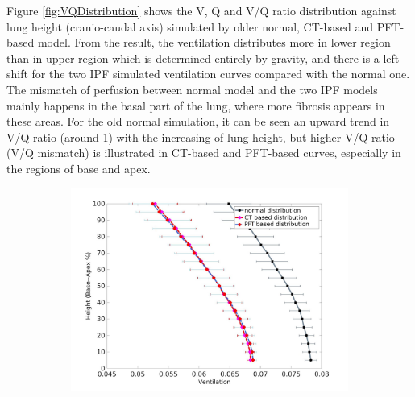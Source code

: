 Figure \ref{fig:VQDistribution} shows the V, Q and V/Q ratio distribution against lung height (cranio-caudal axis) simulated by older normal, CT-based and PFT-based model. From the result, the ventilation distributes more in lower region than in upper region which is determined entirely by gravity, and there is a left shift for the two IPF simulated ventilation curves compared with the normal one. The mismatch of perfusion between normal model and the two IPF models mainly happens in the basal part of the lung, where more fibrosis appears in these areas. For the old normal simulation, it can be seen an upward trend in V/Q ratio (around 1) with the increasing of lung height, but higher V/Q ratio (V/Q mismatch) is illustrated in CT-based and PFT-based curves, especially in the regions of base and apex.

\begin{figure}[htbp]  
\centering
\begin{subfigure}{.6\linewidth}%
  \includegraphics[width=\linewidth,trim={{.0\wd0} {.0\wd0} {.0\wd0} {.0\wd0}},clip]{ModelBasedAnalysis/Image/VentilationAgainstLungHeight.jpg} %

\end{subfigure}
\end{figure}
